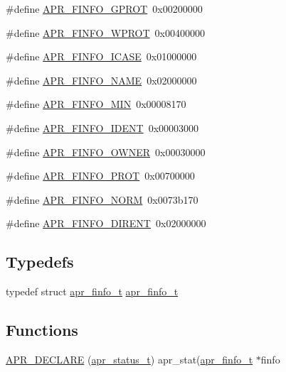 \begin{DoxyCompactItemize}
\#define \mbox{\hyperlink{group__apr__file__stat_gadfa294303e34528b1fcae1bc009140c1}{A\+P\+R\+\_\+\+F\+I\+N\+F\+O\+\_\+\+G\+P\+R\+OT}}~0x00200000
\item 
\#define \mbox{\hyperlink{group__apr__file__stat_gab970792384fe9a805cf66983350eefdc}{A\+P\+R\+\_\+\+F\+I\+N\+F\+O\+\_\+\+W\+P\+R\+OT}}~0x00400000
\item 
\#define \mbox{\hyperlink{group__apr__file__stat_gac46eeba0ae0e771c6ed3cb27fd5492d8}{A\+P\+R\+\_\+\+F\+I\+N\+F\+O\+\_\+\+I\+C\+A\+SE}}~0x01000000
\item 
\#define \mbox{\hyperlink{group__apr__file__stat_ga7fa4caf84808c11a1ec33c5c8d613e4b}{A\+P\+R\+\_\+\+F\+I\+N\+F\+O\+\_\+\+N\+A\+ME}}~0x02000000
\item 
\#define \mbox{\hyperlink{group__apr__file__stat_ga341104571b05550aa923cb14898a82ef}{A\+P\+R\+\_\+\+F\+I\+N\+F\+O\+\_\+\+M\+IN}}~0x00008170
\item 
\#define \mbox{\hyperlink{group__apr__file__stat_ga3ac8c8d0492291417be3d32556464108}{A\+P\+R\+\_\+\+F\+I\+N\+F\+O\+\_\+\+I\+D\+E\+NT}}~0x00003000
\item 
\#define \mbox{\hyperlink{group__apr__file__stat_ga27dee9407b38a459c57618098c3920b0}{A\+P\+R\+\_\+\+F\+I\+N\+F\+O\+\_\+\+O\+W\+N\+ER}}~0x00030000
\item 
\#define \mbox{\hyperlink{group__apr__file__stat_gad902be0636860cb3f8ad76a59abbcd7c}{A\+P\+R\+\_\+\+F\+I\+N\+F\+O\+\_\+\+P\+R\+OT}}~0x00700000
\item 
\#define \mbox{\hyperlink{group__apr__file__stat_gad3f64010d25d2fe926191804d7c99379}{A\+P\+R\+\_\+\+F\+I\+N\+F\+O\+\_\+\+N\+O\+RM}}~0x0073b170
\item 
\#define \mbox{\hyperlink{group__apr__file__stat_gaac6679307cc735f2f0373960db96b931}{A\+P\+R\+\_\+\+F\+I\+N\+F\+O\+\_\+\+D\+I\+R\+E\+NT}}~0x02000000
\end{DoxyCompactItemize}
\subsection*{Typedefs}
\begin{DoxyCompactItemize}
\item 
typedef struct \mbox{\hyperlink{structapr__finfo__t}{apr\+\_\+finfo\+\_\+t}} \mbox{\hyperlink{group__apr__file__stat_ga3d390fdda1d16ae462c11b2d3b18efd1}{apr\+\_\+finfo\+\_\+t}}
\end{DoxyCompactItemize}
\subsection*{Functions}
\begin{DoxyCompactItemize}
\item 
\mbox{\hyperlink{group__apr__file__stat_gaf4677630103e7b0971a3a5967fb7d829}{A\+P\+R\+\_\+\+D\+E\+C\+L\+A\+RE}} (\mbox{\hyperlink{group__apr__errno_gaf76ee4543247e9fb3f3546203e590a6c}{apr\+\_\+status\+\_\+t}}) apr\+\_\+stat(\mbox{\hyperlink{structapr__finfo__t}{apr\+\_\+finfo\+\_\+t}} $\ast$finfo
\end{DoxyCompactItemize}
